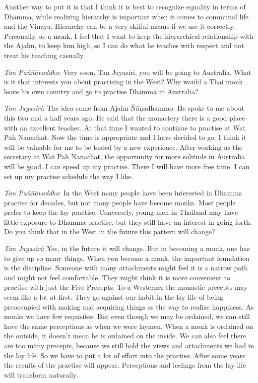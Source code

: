 Another way to put it is that I think it is best
to recognize equality in terms of Dhamma, while realizing hierarchy is
important when it comes to communal life and the Vinaya. Hierarchy can
be a very skilful means if we use it correctly. Personally, as a monk, I
feel that I want to keep the hierarchical relationship with the Ajahn, 
to keep him high, so I can do what he teaches with respect and not treat
his teaching casually. 

\emph{Tan Paññāvuddho}: Very soon, Tan Jayasiri, you will be going to
Australia. What is it that interests you about practising in the West? 
Why would a Thai monk leave his own country and go to practise Dhamma in
Australia? 

\emph{Tan Jayasiri}: The idea came from Ajahn Ñāṇadhammo. He spoke to me
about this two and a half years ago. He said that the monastery there is
a good place with an excellent teacher. At that time I wanted to
continue to practise at Wat Pah Nanachat. Now the time is appropriate
and I have decided to go. I think it will be valuable for me to be
tested by a new experience. After working as the secretary at Wat Pah
Nanachat, the opportunity for more solitude in Australia will be good. I
can speed up my practise. There I will have more free time. I can set up
my practise schedule the way I like. 

\emph{Tan Paññāvuddho}: In the West many people have been interested in
Dhamma practise for decades, but not many people have become monks. Most
people prefer to keep the lay practise. Conversely, young men in
Thailand may have little exposure to Dhamma practise, but they still
have an interest in going forth. Do you think that in the West in the
future this pattern will change? 

\emph{Tan Jayasiri}: Yes, in the future it will change. But in becoming
a monk, one has to give up so many things. When you become a monk, the
important foundation is the discipline. Someone with many attachments
might feel it is a narrow path and might not feel comfortable. They
might think it is more convenient to practise with just the Five
Precepts. To a Westerner the monastic precepts may seem like a lot at
first. They go against our habit in the lay life of being preoccupied
with making and acquiring things as the way to realize happiness. As
monks we have few requisites. But even though we may be ordained, we can
still have the same perceptions as when we were laymen. When a monk is
ordained on the outside, it doesn't mean he is ordained on the inside. 
We can also feel there are too many precepts, because we still hold the
views and attachments we had in the lay life. So we have to put a lot of
effort into the practise. After some years the results of the practise
will appear. Perceptions and feelings from the lay life will transform
naturally. 


